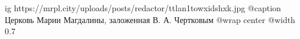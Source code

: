  
 
 
 
 

\ifcmt
  ig https://mrpl.city/uploads/posts/redactor/ttlan1towxidshxk.jpg
	@caption Церковь Марии Магдалины, заложенная В. А. Чертковым
  @wrap center
  @width 0.7
\fi
